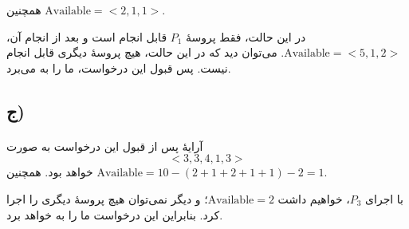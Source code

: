 \documentclass{article}
\begin{document}
	همچنین
	$\textrm{Available} = <2, 1, 1>$.

	در این حالت، فقط پروسهٔ
	$P_1$
	قابل انجام است و بعد از انجام آن،
	$\textrm{Available} = <5, 1, 2>$.
	می‌توان دید که در این حالت، هیچ پروسهٔ دیگری قابل انجام نیست. پس قبول این درخواست، ما را به
	می‌برد.

	\subsection*{ج)}
	\paragraph*{}
	آرایهٔ
	پس از قبول این درخواست به صورت
	\begin{equation*}
		<3, 3, 4, 1, 3>
	\end{equation*}
	خواهد بود. همچنین
	$\textrm{Available} = 10 - (2+1+2+1+1) - 2 = 1$.

	با اجرای
	$P_3$،
	خواهیم داشت
	$\textrm{Available} = 2$؛
	و دیگر نمی‌توان هیچ پروسهٔ دیگری را اجرا کرد. بنابراین این درخواست ما را به
	خواهد برد.
\end{document}

